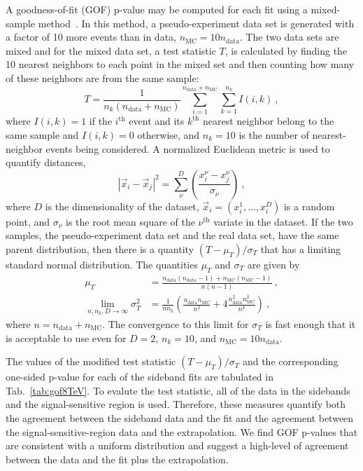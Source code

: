 A goodness-of-fit (GOF) p-value may be computed for each fit using a
mixed-sample method~\cite{Williams:2010vh,10.2307/2289012}. In this method, a
pseudo-experiment data set is generated with a factor of 10 more
events than in data, $n_\mathrm{MC} = 10n_\mathrm{data}$. The two data sets are mixed and for the mixed
data set, a test statistic $T$, is calculated by finding the 10 nearest
neighbors to each point in the mixed set and then counting how many of
these neighbors are from the same sample:
\begin{equation}
T = \frac{1}{n_k(n_\mathrm{data}+n_\mathrm{MC})}\sum_{i=1}^{n_\mathrm{data}+n_\mathrm{MC}}\sum_{k=1}^{n_k} I(i,k)~,
\end{equation}
where $I(i,k)=1$ if the $i^{\mathrm{th}}$ event and its
$k^{\mathrm{th}}$ nearest neighbor belong to the same sample and
$I(i,k)=0$ otherwise, and $n_k=10$ is the number of nearest-neighbor
events being considered. A normalized Euclidean metric is used to quantify distances,
\begin{equation}
|\vec x_i - \vec x_j|^2  =\sum_{\nu}^D\left ( \frac{x_i^\nu-x_j^\nu}{\sigma_{\nu}} \right)~,
\end{equation}
where $D$ is the dimensionality of the dataset, $\vec x_i =
(x_i^1,\ldots,x_i^D)$ is a random point, and $\sigma_{\nu}$ is the
root mean square of the $\nu^{\mathrm{th}}$ variate in the dataset. If
the two samples, the pseudo-experiment data set and the real data
set, have the same parent distribution, then there is a quantity
$(T-\mu_T)/\sigma_T$ that has a limiting standard normal
distribution. The quantities $\mu_T$ and $\sigma_T$ are given by
\begin{align}
\mu_T &=
        \frac{n_\mathrm{data}(n_\mathrm{data}-1)+n_\mathrm{MC}(n_\mathrm{MC}-1)}{n(n-1)}~,\\
\lim_{n,n_k,D\to\infty}\sigma_T^2 &=\frac{1}{nn_k}\left (
                                    \frac{n_\mathrm{data}n_\mathrm{MC}}{n^2}
                                    + 4\frac{n_\mathrm{data}^2n_\mathrm{MC}^2}{n^4}\right)~,
\end{align}
where $n=n_\mathrm{data}+n_\mathrm{MC}$. The convergence to this limit
for $\sigma_T$ is fast enough that it is acceptable to use even for $D=2$,
$n_k=10$, and $n_\mathrm{MC}=10n_\mathrm{data}$.

The values of the modified test statistic $(T-\mu_T)/\sigma_T$ and the
corresponding one-sided p-value for each of the sideband fits are
tabulated in Tab.~\ref{tab:gof8TeV}. To evalute the test statistic, all of the data in the sidebands
   and the signal-sensitive region is used. Therefore, these measures
   quantify both the agreement between the sideband
   data and the fit and the agreement between the signal-sensitive-region
   data and the extrapolation. We find GOF p-values that are consistent with a
   uniform distribution and suggest a high-level of agreement between
   the data and the fit plus the extrapolation.

